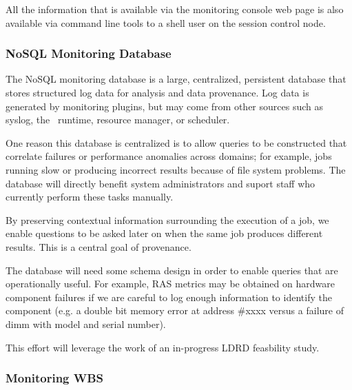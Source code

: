 All the information that is available via the monitoring console web page
is also available via command line tools to a shell user on the session
control node.

\subsubsection{NoSQL Monitoring Database}

The NoSQL monitoring database is a large, centralized, persistent database
that stores structured log data for analysis and data provenance.
Log data is generated by monitoring plugins, but may come from other sources
such as syslog, the \ngrm\ runtime, resource manager, or scheduler.

One reason this database is centralized is to allow queries
to be constructed that correlate failures or performance anomalies
across domains; for example, jobs running slow or producing incorrect
results because of file system problems.  The database will directly
benefit system administrators and suport staff who currently perform
these tasks manually.

By preserving contextual information surrounding the execution of a job,
we enable questions to be asked later on when the same job produces
different results.  This is a central goal of provenance.

The database will need some schema design in order to enable queries
that are operationally useful.  For example, RAS metrics may be obtained
on hardware component failures if we are careful to log enough information
to identify the component (e.g. a double bit memory error at address \#xxxx
versus a failure of dimm with model and serial number).

This effort will leverage the work of an in-progress LDRD
feasbility study\cite{LogLDRD}.

\subsubsection{Monitoring WBS}

